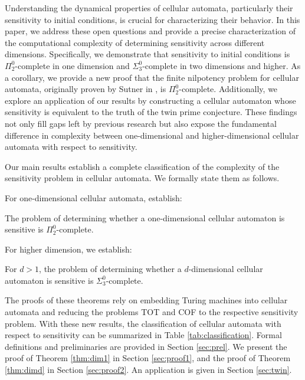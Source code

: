 \documentclass{llncs}
\begin{document}
Understanding the dynamical properties of cellular automata, particularly their sensitivity to initial conditions, is crucial for characterizing their behavior. In this paper, we address these open questions and provide a precise characterization of the computational complexity of determining sensitivity across different dimensions. Specifically, we demonstrate that sensitivity to initial conditions is $\Pi^0_2$-complete in one dimension and $\Sigma^0_3$-complete in two dimensions and higher. As a corollary, we provide a new proof that the finite nilpotency problem for cellular automata, originally proven by Sutner in \cite{sutner1989}, is $\Pi^0_2$-complete. Additionally, we explore an application of our results by constructing a cellular automaton whose sensitivity is equivalent to the truth of the twin prime conjecture. These findings not only fill gaps left by previous research but also expose the fundamental difference in complexity between one-dimensional and higher-dimensional cellular automata with respect to sensitivity.

Our main results establish a complete classification of the complexity of the sensitivity problem in cellular automata. We formally state them as follows.

For one-dimensional cellular automata, establish:

\begin{theorem}\label{thm:dim1}
The problem of determining whether a one-dimensional cellular automaton is sensitive is $\Pi^0_2$-complete.
\end{theorem}

For higher dimension, we establish:

\begin{theorem}\label{thm:dimd}
For $d > 1$, the problem of determining whether a $d$-dimensional cellular automaton is sensitive is $\Sigma^0_3$-complete.
\end{theorem}

The proofs of these theorems rely on embedding Turing machines into cellular automata and reducing the problems TOT and COF to the respective sensitivity problem. With these new results, the classification of cellular automata with respect to sensitivity can be summarized in Table \ref{tab:classification}. Formal definitions and preliminaries are provided in Section \ref{sec:prel}. We present the proof of Theorem \ref{thm:dim1} in Section \ref{sec:proof1}, and the proof of Theorem \ref{thm:dimd} in Section \ref{sec:proof2}. An application is given in Section \ref{sec:twin}.
\end{document}
